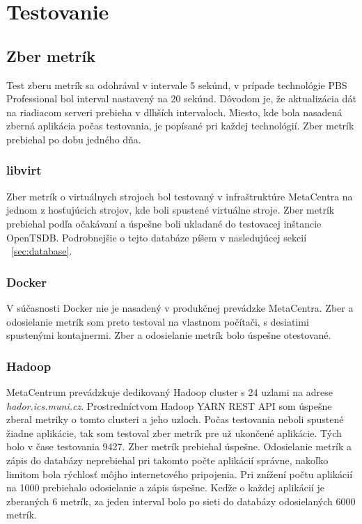 \documentclass[printed,11pt,twoside,color,cover,table]{fithesis3}
\begin{document}
\chapter{Testovanie}
\section{Zber metrík}
Test zberu metrík sa odohrával v intervale 5 sekúnd, v prípade technológie PBS Professional bol interval nastavený na 20 sekúnd.
Dôvodom je, že aktualizácia dát na riadiacom serveri prebieha v dlhších intervaloch. Miesto, kde bola nasadená zberná aplikácia počas testovania,
je popísané pri každej technológií. Zber metrík prebiehal po dobu jedného dňa.

\subsection{libvirt}
Zber metrík o virtuálnych strojoch bol testovaný v infraštruktúre MetaCentra na jednom z hosťujúcich strojov, kde boli spustené
virtuálne stroje. Zber metrík prebiehal podľa očakávaní a úspešne boli ukladané do testovacej inštancie OpenTSDB. Podrobnejšie o tejto
databáze píšem v nasledujúcej sekcií ~\ref{sec:database}.

\subsection{Docker}
V súčasnosti Docker nie je nasadený v produkčnej prevádzke MetaCentra. Zber a odosielanie metrík som preto testoval na vlastnom počítači,
s desiatimi spustenými kontajnermi. Zber a odosielanie metrík bolo úspešne otestované.

\subsection{Hadoop}
MetaCentrum prevádzkuje dedikovaný Hadoop cluster s 24 uzlami na adrese \textit{hador.ics.muni.cz}. Prostredníctvom Hadoop YARN REST API som úspešne zberal metriky o
tomto clusteri a jeho uzloch. Počas testovania neboli spustené žiadne aplikácie, tak som testoval zber metrík pre už ukončené aplikácie.
Tých bolo v čase testovania 9427. Zber metrík prebiehal úspešne. Odosielanie metrík a zápis do databázy neprebiehal pri takomto počte aplikácií správne,
nakoľko limitom bola rýchlosť môjho internetového pripojenia. Pri znížení počtu aplikácií na 1000 prebiehalo odosielanie a zápis
úspešne. Keďže o každej aplikácií je zberaných 6 metrík, za jeden interval bolo po sieti do databázy odosielaných 6000 metrík.
\end{document}
